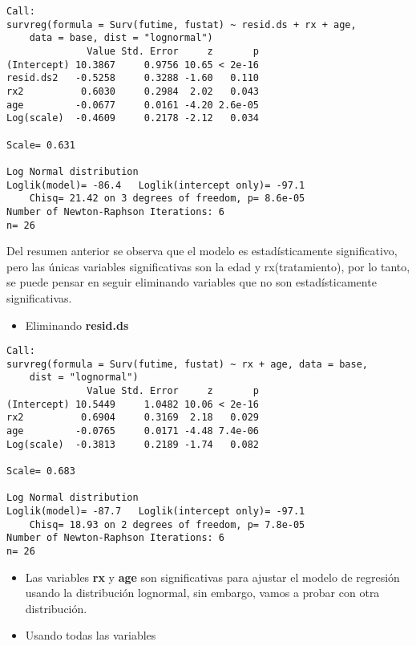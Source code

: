 \documentclass[
]{article}
\providecommand{\tightlist}{%
  \setlength{\itemsep}{0pt}\setlength{\parskip}{0pt}}
\begin{document}
\begin{verbatim}
Call:
survreg(formula = Surv(futime, fustat) ~ resid.ds + rx + age, 
    data = base, dist = "lognormal")
              Value Std. Error     z       p
(Intercept) 10.3867     0.9756 10.65 < 2e-16
resid.ds2   -0.5258     0.3288 -1.60   0.110
rx2          0.6030     0.2984  2.02   0.043
age         -0.0677     0.0161 -4.20 2.6e-05
Log(scale)  -0.4609     0.2178 -2.12   0.034

Scale= 0.631 

Log Normal distribution
Loglik(model)= -86.4   Loglik(intercept only)= -97.1
    Chisq= 21.42 on 3 degrees of freedom, p= 8.6e-05 
Number of Newton-Raphson Iterations: 6 
n= 26 
\end{verbatim}

Del resumen anterior se observa que el modelo es estadísticamente
significativo, pero las únicas variables significativas son la edad y
rx(tratamiento), por lo tanto, se puede pensar en seguir eliminando
variables que no son estadísticamente significativas.

\begin{itemize}
\tightlist
\item
  Eliminando \textbf{resid.ds}
\end{itemize}

\begin{verbatim}
Call:
survreg(formula = Surv(futime, fustat) ~ rx + age, data = base, 
    dist = "lognormal")
              Value Std. Error     z       p
(Intercept) 10.5449     1.0482 10.06 < 2e-16
rx2          0.6904     0.3169  2.18   0.029
age         -0.0765     0.0171 -4.48 7.4e-06
Log(scale)  -0.3813     0.2189 -1.74   0.082

Scale= 0.683 

Log Normal distribution
Loglik(model)= -87.7   Loglik(intercept only)= -97.1
    Chisq= 18.93 on 2 degrees of freedom, p= 7.8e-05 
Number of Newton-Raphson Iterations: 6 
n= 26 
\end{verbatim}

\begin{itemize}
\tightlist
\item
  Las variables \textbf{rx} y \textbf{age} son significativas para
  ajustar el modelo de regresión usando la distribución lognormal, sin
  embargo, vamos a probar con otra distribución.
\end{itemize}


\begin{itemize}
\tightlist
\item
  Usando todas las variables
\end{itemize}
\end{document}
